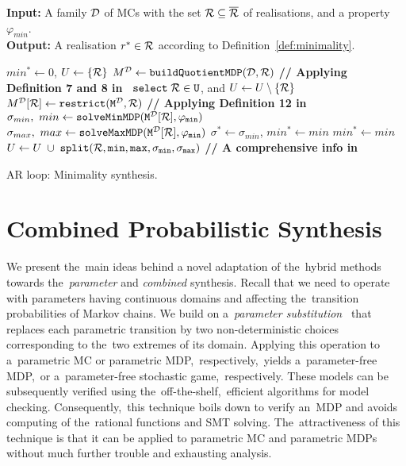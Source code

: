 \begin{algorithm}[h!]
\hspace*{\algorithmicindent} \textbf{Input:} A family $\mathcal{D}$ of MCs with the set $\mathcal{R} \subseteq \overline{\mathcal{R}}$ of realisations, and a property $\varphi_{min}$. \\
\hspace*{\algorithmicindent} \textbf{Output:}  A realisation $r^* \in \mathcal{R}$ according to Definition~\ref{def:minimality}. \\
\vspace*{-1.5em}
\begin{algorithmic}[1]
    \STATE $min^* \leftarrow 0$, $U \leftarrow \{ \mathcal{R} \}$
    \STATE $M^{\mathcal{D}} \leftarrow \mathtt{buildQuotientMDP(\mathcal{D}, \mathcal{R})}$ \hfill \textbf{// Applying Definition 7 and 8 in~\cite{cegar}}
        \STATE $\mathtt{select \; \mathcal{R} \in U}$, and $U \leftarrow U \setminus \{ \mathcal{R} \}$
        \STATE $M^{\mathcal{D}}[\mathcal{R}] \leftarrow \mathtt{restrict(M^{\mathcal{D}}, \mathcal{R})}$ \hfill \textbf{// Applying Definition 12 in~\cite{cegar}}
        \STATE $\sigma_{min}, \ min \leftarrow \mathtt{solveMinMDP(M^{\mathcal{D}}[\mathcal{R}], \varphi_{min})}$
        \STATE $\sigma_{max}, \ max \leftarrow \mathtt{solveMaxMDP(M^{\mathcal{D}}[\mathcal{R}], \varphi_{min})}$
                \STATE $\sigma^* \leftarrow \sigma_{min}$, $min^* \leftarrow min$
            \ELSE
                    \STATE $min^* \leftarrow min$
                \ENDIF
                \STATE $U \leftarrow U \; \cup \; \mathtt{split(\mathcal{R}, min, max, \sigma_{min}, \sigma_{max})}$ \hfill \textbf{// A comprehensive info in~\cite{cegar}}
            \ENDIF
        \ENDIF
    \ENDWHILE
\end{algorithmic}
\caption{AR loop: Minimality synthesis.}
\label{alg:ar_optimal}
\end{algorithm}

\section{Combined Probabilistic Synthesis}
We present the~main ideas behind a novel adaptation of the~hybrid methods towards the~\textit{parameter} and \textit{combined} synthesis.
Recall that we need to operate with parameters having continuous domains and affecting the~transition probabilities of Markov chains.
We build on a~\emph{parameter substitution}~\cite{Quatmann2016}
that replaces each parametric transition by two non-deterministic choices corresponding to the~two extremes of its domain.
Applying this operation to a~parametric MC or parametric MDP,~respectively,~yields a~parameter-free MDP,~or a~parameter-free stochastic game,~respectively.
These models can be subsequently verified using the~off-the-shelf,~efficient algorithms for model checking.
Consequently,~this technique boils down to verify an~MDP and avoids computing of the~rational functions and SMT solving.
The~attractiveness of this technique is that it can be applied to parametric MC and parametric MDPs without much further trouble and exhausting analysis.

